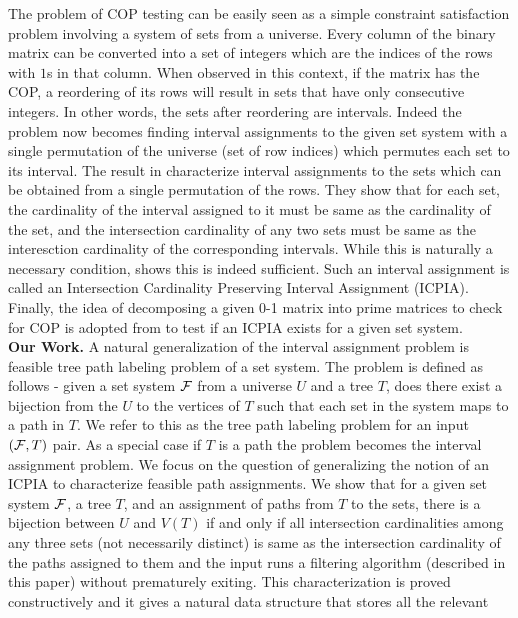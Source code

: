 \documentclass{CRPITStyle} %
\renewcommand{\cite}{\citep}%
\def\cF{{\cal F}}
\def\xnoindent{} %
\begin{document}
\xnoindent
The problem of COP testing can be easily seen as a simple constraint
satisfaction problem involving a system of sets from a universe. Every
column of the binary matrix can be converted into a set of integers
which are the indices of the rows with $1$s in that column. When
observed in this context, if the matrix has the COP, a reordering of
its rows will result in sets that have only consecutive integers. In
other words, the sets after reordering are intervals. Indeed the
problem now becomes finding interval assignments to the given set
system \cite{nsnrs09} with a single permutation of the universe (set
of row indices) which permutes each set to its interval. The result in
\cite{nsnrs09} characterize interval assignments to the sets which can
be obtained from a single permutation of the rows.  They show that for
each set, the cardinality of the interval assigned to it must be same
as the cardinality of the set, and the intersection cardinality of any
two sets must be same as the interesction cardinality of the
corresponding intervals.  While this is naturally a necessary
condition, \cite{nsnrs09} shows this is indeed sufficient.  Such an
interval assignment is called an Intersection Cardinality Preserving
Interval Assignment (ICPIA).  Finally, the idea of decomposing a given
0-1 matrix into prime matrices to check for COP is adopted from
\cite{wlh02} to test if an ICPIA exists for a given set system.\\
{\bf Our Work.}  A natural generalization of the interval assignment
problem is feasible tree path labeling problem of a set system. The
problem is defined as follows - given a set system $\cF$ from a
universe $U$ and a tree $T$, does there exist a bijection from the $U$
to the vertices of $T$ such that each set in the system maps to a path
in $T$.  We refer to this as the tree path labeling problem for an
input $(\cF,T)$ pair. As a special case if $T$ is a path the problem
becomes the interval assignment problem.  We focus on the question of
generalizing the notion of an ICPIA \cite{nsnrs09} to characterize
feasible path assignments.  We show that for a given set system $\cF$,
a tree $T$, and an assignment of paths from $T$ to the sets, there is
a bijection between $U$ and $V(T)$ if and only if all intersection
cardinalities among any three sets (not necessarily distinct) is same
as the intersection cardinality of the paths assigned to them and the
input runs a filtering algorithm (described in this paper) without
prematurely exiting.  This characterization is proved constructively
and it gives a natural data structure that stores all the relevant
\end{document}
